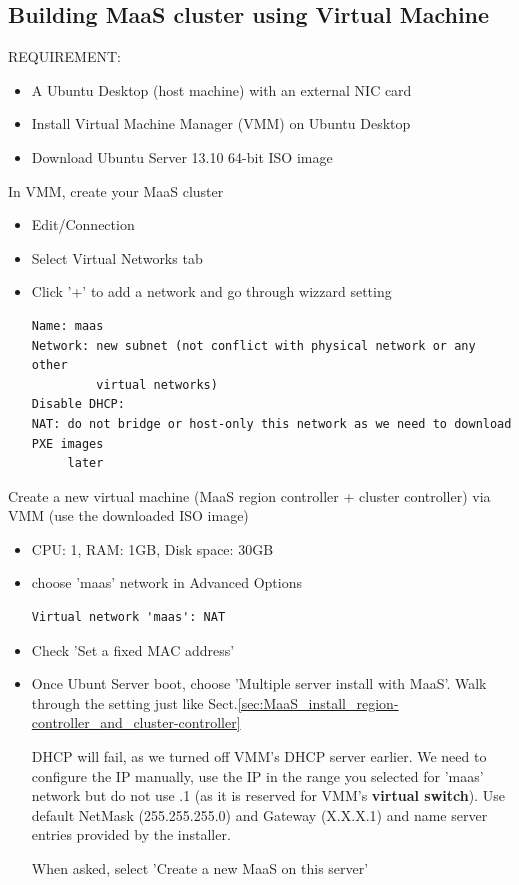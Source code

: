 \subsection{Building MaaS cluster using Virtual Machine}

REQUIREMENT:
\begin{itemize}
  \item A Ubuntu Desktop (host machine) with an external NIC card
  \item Install Virtual Machine Manager (VMM) on Ubuntu Desktop	
  \item Download Ubuntu Server 13.10 64-bit ISO image
\end{itemize}

In VMM, create your MaaS cluster
\begin{itemize}
  \item Edit/Connection 
  \item Select Virtual Networks tab
  \item Click '+' to add a network and go through wizzard setting
\begin{verbatim}
Name: maas
Network: new subnet (not conflict with physical network or any other 
         virtual networks)
Disable DHCP: 
NAT: do not bridge or host-only this network as we need to download PXE images
     later
\end{verbatim}  
\end{itemize}



Create a new virtual machine (MaaS region controller + cluster controller) via
VMM (use the downloaded ISO image)
\begin{itemize}
  \item CPU: 1, RAM: 1GB, Disk space: 30GB
  \item choose 'maas' network in Advanced Options
\begin{verbatim}
Virtual network 'maas': NAT
\end{verbatim}
  \item Check 'Set a fixed MAC address'
  
  \item Once Ubunt Server boot, choose 'Multiple server install with MaaS'. Walk
  through the setting just like
  Sect.\ref{sec:MaaS_install_region-controller_and_cluster-controller}	
  
  DHCP will fail, as we turned off VMM's DHCP server earlier. We need to
  configure the IP manually, use the IP in the range you selected for 'maas'
  network but do not use .1 (as it is reserved for VMM's {\bf virtual switch}).
  Use default NetMask (255.255.255.0) and Gateway (X.X.X.1) and name server
  entries provided by the installer. 
  
  When asked, select 'Create a new MaaS on this server'
  
\end{itemize}

